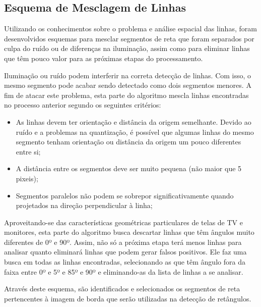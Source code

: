 \subsection{Esquema de Mesclagem de Linhas}

Utilizando os conhecimentos sobre o problema e análise espacial das linhas, foram desenvolvidos esquemas para mesclar segmentos de reta que foram separados por culpa do ruído ou de diferenças na iluminação, assim como para eliminar linhas que têm pouco valor para as próximas etapas do processamento.


Iluminação ou ruído podem interferir na correta detecção de linhas. Com isso, o mesmo segmento pode acabar sendo detectado como dois segmentos menores. A fim de atacar este problema, esta parte do algoritmo mescla linhas encontradas no processo anterior segundo os seguintes critérios:
\begin{itemize}
\item As linhas devem ter orientação e distância da origem semelhante. Devido ao ruído e a problemas na quantização, é possível que algumas linhas do mesmo segmento tenham orientação ou distância da origem um pouco diferentes entre si;
\item A distância entre os segmentos deve ser muito pequena (não maior que 5 pixeis);
\item Segmentos paralelos não podem se sobrepor significativamente quando projetados na direção perpendicular à linha;
\end{itemize}



Aproveitando-se das características geométricas particulares de telas de TV e monitores, esta parte do algoritmo busca descartar linhas que têm ângulos muito diferentes de 0º e 90º. Assim, não só a próxima etapa terá menos linhas para analisar quanto eliminará linhas que podem gerar falsos positivos.
Ele faz uma busca em todas as linhas encontradas, selecionando as que têm ângulo fora da faixa entre 0º e 5º e 85º e 90º e eliminando-as da lista de linhas a se analisar.

Através deste esquema, são identificados e selecionados os segmentos de reta pertencentes à imagem de borda que serão utilizadas na detecção de retângulos.



